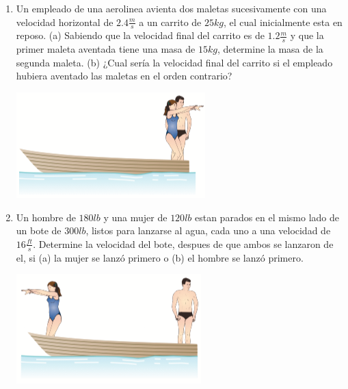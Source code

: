 \begin{enumerate}
	\item Un empleado de una aerolinea avienta dos maletas sucesivamente con una velocidad horizontal de $2.4 \frac{m}{s}$ a un carrito de $25 kg$, el cual inicialmente esta en reposo. (a) Sabiendo que la velocidad final del carrito es de $1.2 \frac{m}{s}$ y que la primer maleta aventada tiene una masa de $15kg$, determine la masa de la segunda maleta. (b) ¿Cual sería la velocidad final del carrito si el empleado hubiera aventado las maletas en el orden contrario?

	\begin{marginfigure}
			\includegraphics[width=\textwidth]{./images/juntos.png}
	\end{marginfigure}

	\item Un hombre de $180 lb$ y una mujer de $120 lb$ estan parados en el mismo lado de un bote de $300 lb$, listos para lanzarse al agua, cada uno a una velocidad de $16 \frac{ft}{s}$. Determine la velocidad del bote, despues de que ambos se lanzaron de el, si (a) la mujer se lanzó primero o (b) el hombre se lanzó primero.

	\begin{marginfigure}
			\includegraphics[width=\textwidth]{./images/separados.png}
	\end{marginfigure}


\end{enumerate}
